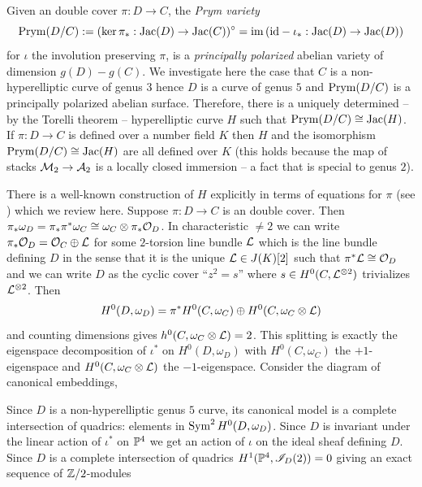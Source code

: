 \documentclass[main.tex]{subfiles}
\begin{document}
Given an \etale double cover $\pi : D \to C$, the \textit{Prym variety}
\[ \Prym(D/C) :=  (\ker{\pi_* : \Jac(D) \to \Jac(C)})^{\circ} = \im{(\id - \iota_* : \Jac(D) \to \Jac(D))} \]
for $\iota$ the involution preserving $\pi$, is a \textit{principally polarized} abelian variety of dimension $g(D) - g(C)$. We investigate here the case that $C$ is a non-hyperelliptic curve of genus $3$ hence $D$ is a curve of genus $5$ and $\Prym(D/C)$ is a principally polarized abelian surface. Therefore, there is a uniquely determined -- by the Torelli theorem -- hyperelliptic curve $H$ such that $\Prym(D/C) \cong \Jac(H)$. If $\pi : D \to C$ is defined over a number field $K$ then $H$ and the isomorphism $\Prym(D/C) \cong \Jac(H)$ are all defined over $K$ (this holds because the map of stacks $\cM_2 \to \cA_2$ is a locally closed immersion \cite[Theorem 1.2]{aaron:torelli_map} -- a fact that is special to genus $2$).
\par 
There is a well-known construction of $H$ explicitly in terms of equations for $\pi$ (see \cite{bruin:prym_genus_3}) which we review here. Suppose $\pi : D \to C$ is an \etale double cover. Then $\pi_* \omega_D = \pi_* \pi^* \omega_C \cong \omega_C \ot \pi_* \cO_D$. In characteristic $\neq 2$ we can write $\pi_* \cO_D = \cO_C \oplus \L$ for some $2$-torsion line bundle $\L$ which is the line bundle defining $D$ in the sense that it is the unique $\L \in J(K)[2]$ such that $\pi^* \L \cong \cO_D$ and we can write $D$ as the cyclic cover ``$z^2 = s$'' where $s \in H^0(C, \L^{\ot 2})$ trivializes $\L^{\ot 2}$. Then
\[ H^0(D, \omega_D) = \pi^* H^0(C, \omega_C) \oplus H^0(C, \omega_C \ot \L) \]
and counting dimensions gives $h^0(C, \omega_C \ot \L) = 2$. This splitting is exactly the eigenspace decomposition of $\iota^*$ on $H^0(D, \omega_D)$ with $H^0(C, \omega_C)$ the $+1$-eigenspace and $H^0(C, \omega_C \ot \L)$ the $-1$-eigenspace. Consider the diagram of canonical embeddings,
\begin{center}
\end{center}
Since $D$ is a non-hyperelliptic genus $5$ curve, its canonical model is a complete intersection of quadrics: elements in $\Sym^2 H^0(D, \omega_D)$. Since $D$ is invariant under the linear action of $\iota^*$ on $\P^4$ we get an action of $\iota$ on the ideal sheaf defining $D$. Since $D$ is a complete intersection of quadrics $H^1(\P^4, \I_D(2)) = 0$ giving an exact sequence of $\Z/2$-modules
\end{document}
